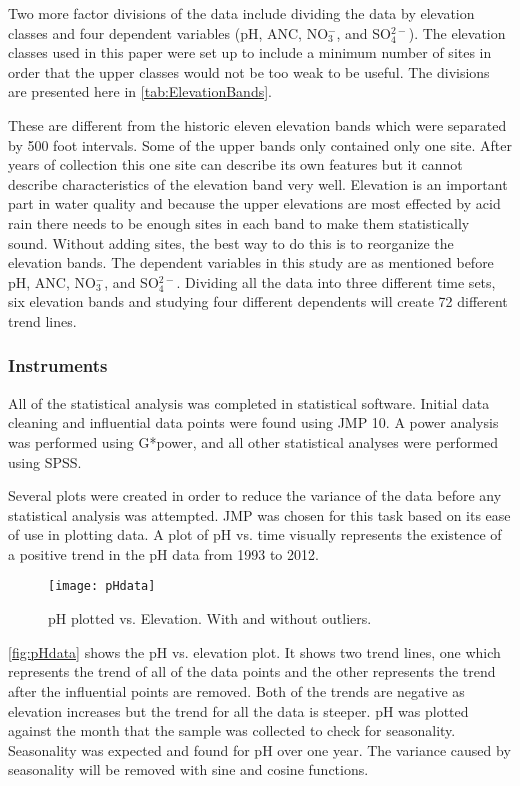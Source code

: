 Two more factor divisions of the data include dividing the data by elevation classes and four dependent variables (pH, ANC, NO$_3^-$, and SO$_4^{2-}$). The elevation classes used in this paper were set up to include a minimum number of sites in order that the upper classes would not be too weak to be useful. The divisions are presented here in \autoref{tab:ElevationBands}.

These are different from the historic eleven elevation bands which were separated by 500 foot intervals. Some of the upper bands only contained only one site. After years of collection this one site can describe its own features but it cannot describe characteristics of the elevation band very well. Elevation is an important part in water quality and because the upper elevations are most effected by acid rain there needs to be enough sites in each band to make them statistically sound. Without adding sites, the best way to do this is to reorganize the elevation bands. The dependent variables in this study are as mentioned before pH, ANC, NO$_3^-$, and SO$_4^{2-}$. %
Dividing all the data into three different time sets, six elevation bands and studying four different dependents will create 72 different trend lines.

\subsubsection{Instruments}

All of the statistical analysis was completed in statistical software. Initial data cleaning and influential data points were found using JMP 10. A power analysis was performed using G*power, and all other statistical analyses were performed using SPSS.

Several plots were created in order to reduce the variance of the data before any statistical analysis was attempted. JMP was chosen for this task based on its ease of use in plotting data. A plot of pH vs. time visually represents the existence of a positive trend in the pH data from 1993 to 2012.
\begin{figure}[h!]
\centering
  \texttt{[image: pHdata]}\\
  \caption{pH plotted vs. Elevation.  With and without outliers.}\label{fig:pHdata}
\end{figure}
\autoref{fig:pHdata} shows the pH vs. elevation plot. It shows two trend lines, one which represents the trend of all of the data points and the other represents the trend after the influential points are removed. Both of the trends are negative as elevation increases but the trend for all the data is steeper. pH was plotted against the month that the sample was collected to check for seasonality. Seasonality was expected and found for pH over one year. The variance caused by seasonality will be removed with sine and cosine functions.

